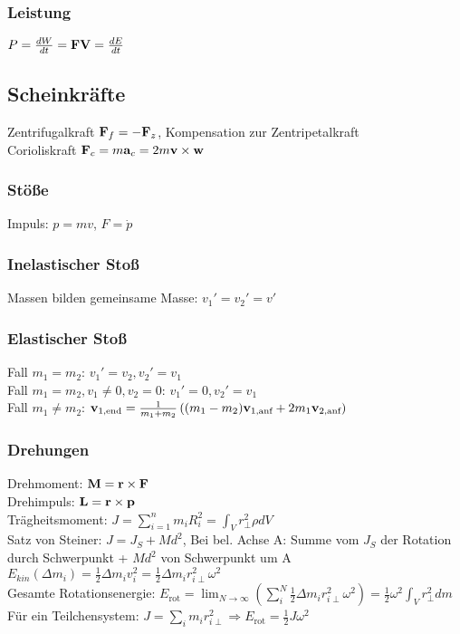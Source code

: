 \documentclass[fs, footer]{latex4ei}
\begin{document}
\begin{multicols*}{4}
\subsubsection{Leistung}
$P = \frac{dW}{dt} = \textbf{F}\textbf{V} = \frac{dE}{dt}$\\

\subsection{Scheinkräfte}%
Zentrifugalkraft $\textbf{F}_f = - \textbf{F}_z$, Kompensation zur Zentripetalkraft\\
Corioliskraft $\textbf{F}_c = m\textbf{a}_c = 2m\textbf{v} \times \textbf{w}$\\

\subsubsection{Stöße}
Impuls: $p = mv$, $F=\dot p$\\
\subsubsection{Inelastischer Stoß}
Massen bilden gemeinsame Masse: $v_1' = v_2' = v'$\\
\subsubsection{Elastischer Stoß}
Fall $m_1 = m_2$: $v_1' = v_2, v_2' = v_1$\\
Fall $m_1 = m_2, v_1 \neq 0, v_2 = 0$: $v_1' = 0, v_2' = v_1$\\
Fall $m_1 \neq m_2$: $\textbf{v}_{\text{1,end}} = \frac{1}{m_1+m_2}\left((m_1-m_2)\textbf{v}_{\text{1,anf}} + 2m_1\textbf{v}_{\text{2,anf}}\right)$\\

\subsubsection{Drehungen}
Drehmoment: $\textbf{M} = \textbf{r} \times \textbf{F}$\\
Drehimpuls: $\textbf{L} = \textbf{r} \times \textbf{p}$\\
Trägheitsmoment: $J = \sum_{i=1}^n m_iR_i^2 = \int_V r_\perp^2\rho dV$\\
Satz von Steiner: $J = J_S + Md^2$, Bei bel. Achse A: Summe vom $J_S$ der Rotation durch Schwerpunkt + $Md^2$ von Schwerpunkt um A\\ %
$E_{kin}(\Delta m_i)=\frac{1}{2}\Delta m_iv_i^2=\frac{1}{2}\Delta m_ir_{i\perp}^2 \omega^2$\\
Gesamte Rotationsenergie: $E_{\text{rot}}=\lim_{N \rightarrow \infty} (\sum_i^N  \frac{1}{2}\Delta m_ir_{i\perp}^2 \omega^2)=\frac{1}{2} \omega ^2\int_Vr_\perp^2 dm$\\
Für ein Teilchensystem: $J = \sum_{i}m_ir_{i\perp}^2 \Rightarrow E_{\text{rot}}=\frac{1}{2}J\omega^2$\\

\end{multicols*}
\end{document}
